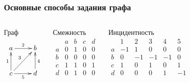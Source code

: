 \begin{frame}
    \frametitle{Основные способы задания графа}
    
    \begin{columns}
            \begin{block}{Граф}
                \[
                    {\xymatrix{
                        a \ar@{->}[r]^2
                            &b
                                \\
                        c \ar@{->}[r]_5 \ar@{->}[ur]^3 \ar@{->}[u]^1
                            &d \ar@{->}[u]_4
                    }}
                \]
            \end{block}
        
            \begin{columns}    
                    \begin{block}{Смежность}
                        \[
                            \begin{array}{c|cccc}
                                 &a&b&c&d\\\hline
                                a&0&1&0&0\\
                                b&0&0&0&0\\
                                c&1&1&0&1\\
                                d&0&1&0&0
                            \end{array}
                        \]
                    \end{block}
                    \begin{block}{Инцидентность}
                        \[
                            \begin{array}{c|ccccc}
                                  & 1 & 2& 3& 4& 5\\ \hline 
                                a & -1& 1& 0& 0& 0\\
                                b & 0 &-1&-1&-1& 0\\
                                c & 1 & 0& 1& 0& 1\\
                                d & 0 & 0& 0& 1&-1
                            \end{array}
                        \]
                    \end{block}
            \end{columns}    
        

\end{columns}
\end{frame}
